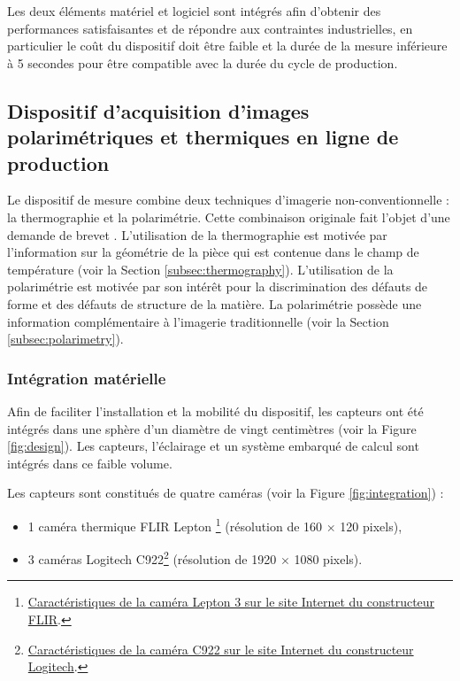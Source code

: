 Les deux éléments matériel et logiciel sont intégrés afin d’obtenir des performances satisfaisantes et de répondre aux contraintes industrielles, en particulier le coût du dispositif doit être faible et la durée de la mesure inférieure à 5 secondes pour être compatible avec la durée du cycle de production.


\subsection{Dispositif d'acquisition d'images polarimétriques et thermiques en ligne de production}
Le dispositif de mesure combine deux techniques d’imagerie non-conventionnelle : la thermographie et la polarimétrie.
Cette combinaison originale fait l'objet d'une demande de brevet  \cite{nagorny_dispositif_2019}.
L'utilisation de la thermographie est motivée par l'information sur la géométrie de la pièce qui est contenue dans le champ de température (voir la Section \ref{subsec:thermography}).
L'utilisation de la polarimétrie est motivée par son intérêt pour la discrimination des défauts de forme et des défauts de structure de la matière.
La polarimétrie possède une information complémentaire à l'imagerie traditionnelle (voir la Section \ref{subsec:polarimetry}).


\subsubsection{Intégration matérielle}
Afin de faciliter l'installation et la mobilité du dispositif, les capteurs ont été intégrés dans une sphère d'un diamètre de vingt centimètres (voir la Figure \ref{fig:design}).
Les capteurs, l'éclairage et un système embarqué de calcul sont intégrés dans ce faible volume.

Les capteurs sont constitués de quatre caméras (voir la Figure \ref{fig:integration}) :
\begin{itemize}
	\item 1 caméra thermique FLIR Lepton \footnote{\href{https://prod.flir.fr/products/lepton/}{Caractéristiques de la caméra Lepton 3 sur le site Internet du constructeur FLIR}.} (résolution de 160 $\times$ 120 pixels),
	\item 3 caméras Logitech C922\footnote{\href{https://www.logitech.fr/fr-fr/product/c922-pro-stream-webcam}{Caractéristiques de la caméra C922 sur le site Internet du constructeur Logitech}.} (résolution de 1920 $\times$ 1080 pixels).
\end{itemize}

